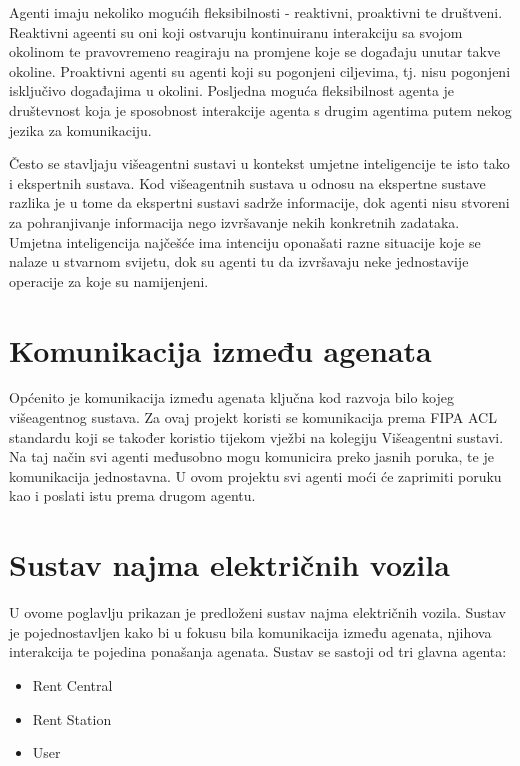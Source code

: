 \documentclass{foi}
\begin{document}
Agenti imaju nekoliko mogućih fleksibilnosti - reaktivni, proaktivni te društveni. Reaktivni ageenti su oni koji ostvaruju kontinuiranu interakciju sa svojom okolinom te pravovremeno reagiraju na promjene koje se događaju unutar takve okoline. Proaktivni agenti su agenti koji su pogonjeni ciljevima, tj. nisu pogonjeni isključivo događajima u okolini. Posljedna moguća fleksibilnost agenta je društevnost koja je sposobnost interakcije agenta s drugim agentima putem nekog jezika za komunikaciju.

Često se stavljaju višeagentni sustavi u kontekst umjetne inteligencije te isto tako i ekspertnih sustava. Kod višeagentnih sustava u odnosu na ekspertne sustave razlika je u tome da ekspertni sustavi sadrže informacije, dok agenti nisu stvoreni za pohranjivanje informacija nego izvršavanje nekih konkretnih zadataka. Umjetna inteligencija najčešće ima intenciju oponašati razne situacije koje se nalaze u stvarnom svijetu, dok su agenti tu da izvršavaju neke jednostavije operacije za koje su namijenjeni.

\section{Komunikacija između agenata}

Općenito je komunikacija između agenata ključna kod razvoja bilo kojeg višeagentnog sustava. Za ovaj projekt koristi se komunikacija prema FIPA ACL standardu koji se također koristio tijekom vježbi na kolegiju Višeagentni sustavi. Na taj način svi agenti međusobno mogu komunicira preko jasnih poruka, te je komunikacija jednostavna. U ovom projektu svi agenti moći će zaprimiti poruku kao i poslati istu prema drugom agentu.
\pagebreak

\section{Sustav najma električnih vozila}

U ovome poglavlju prikazan je predloženi sustav najma električnih vozila. Sustav je pojednostavljen kako bi u fokusu bila komunikacija između agenata, njihova interakcija te pojedina ponašanja agenata. Sustav se sastoji od tri glavna agenta:

\begin{itemize}
	\item Rent Central
	\item Rent Station
	\item User
\end{itemize}
\end{document}
